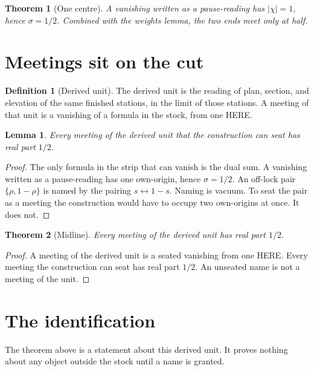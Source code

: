 \documentclass[10pt,a4paper]{article}
\theoremstyle{plain}
\newtheorem{lemma}{Lemma}
\newtheorem{theorem}{Theorem}
\theoremstyle{definition}
\newtheorem{definition}{Definition}
\theoremstyle{remark}
\begin{document}
\begin{theorem}[One centre]
A vanishing written as a pause-reading has \(\lvert\chi\rvert=1\), hence \(\sigma=1/2\).
Combined with the weights lemma, the two ends meet only at half.
\end{theorem}

\section{Meetings sit on the cut}

\begin{definition}[Derived unit]
The derived unit is the reading of plan, section, and elevation of the same finished stations, in the limit of those stations.
A meeting of that unit is a vanishing of a formula in the stock, from one HERE.
\end{definition}

\begin{lemma}
Every meeting of the derived unit that the construction can \emph{seat} has real part \(1/2\).
\end{lemma}

\begin{proof}
The only formula in the strip that can vanish is the dual sum.
A vanishing written as a pause-reading has one own-origin, hence \(\sigma=1/2\).
An off-lock pair \(\{\rho,1-\rho\}\) is named by the pairing \(s\leftrightarrow 1-s\).
Naming is vacuum.
To seat the pair as a meeting the construction would have to occupy two own-origins at once.
It does not.
\end{proof}

\begin{theorem}[Midline]
Every meeting of the derived unit has real part \(1/2\).
\end{theorem}

\begin{proof}
A meeting of the derived unit is a seated vanishing from one HERE.
Every meeting the construction can seat has real part \(1/2\).
An unseated name is not a meeting of the unit.
\end{proof}

\section{The identification}

The theorem above is a statement about this derived unit.
It proves nothing about any object outside the stock until a name is granted.
\end{document}
